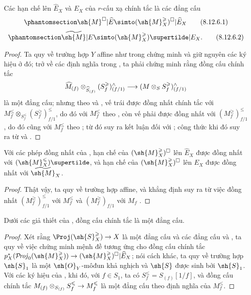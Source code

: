 \documentclass[oneside,10pt]{amsart}
\makeatletter
\renewcommand{\leq}{\leqslant}
\renewcommand{\geq}{\geqslant}
\newcommand{\ega@arrow}[2]{\mathchoice{#1}{#2}{#2}{#2}}
\renewcommand{\to}{\ega@arrow{\longrightarrow}{\rightarrow}}
\def\shProj{\mathcal{P}\!\mathit{roj}}
\newcommand{\oldpage}[2][]{\marginnote{\normalfont\footnotesize\textbf{#1}~|~#2}\ignorespaces}
\let\EGAOriginalLabel\label
\renewcommand{\label}[1]{\phantomsection\EGAOriginalLabel{#1}}
\makeatother
\begin{document}
\begin{proposition}[8.12.6]
\label{II.8.12.6}
Các hạn chế lên $\widehat{E}_X$ và $E_X$ của $r$-cấu xạ chính tắc  là các đẳng cấu
\[
\label{II.8.12.6.1}
  \sh{M}^{\square}|\widehat{E}
  \simto(\sh{M}_X^{\geq})^{\square}|\widehat{E}_X
\tag{8.12.6.1}
\]
\[
\label{II.8.12.6.2}
  \widetilde{\sh{M}}|E
  \simto(\sh{M}_X^{\geq})\supertilde|E_X.
\tag{8.12.6.2}
\]
\end{proposition}

\begin{proof}
Ta quy về trường hợp $Y$ affine như trong chứng minh  và giữ nguyên các ký hiệu ở đó;
trở về các định nghĩa trong , ta phải chứng minh rằng đồng cấu chính tắc
\[
  \widehat{M}_{(f)}\otimes_{\widehat{S}_{(f)}}
  (S_f^{\geq})_{(f/1)}^{\wedge}
  \to(M\otimes_S S_f^{\geq})_{(f/1)}^{\wedge}
\]
là một đẳng cấu;
nhưng theo  và , vế trái được đồng nhất chính tắc với
$M_f^{\leq}\otimes_{S_f^{\leq}}(S_f^{\geq})_{f/1}^{\leq}$, do đó với $M_f^{\leq}$ theo , còn vế phải được đồng nhất với $(M_f^{\geq})_{f/1}^{\leq}$, do đó cũng với $M_f^{\leq}$ theo ;
từ đó suy ra kết luận đối với ;
công thức  khi đó suy ra từ  và .
\end{proof}

\begin{corollary}[8.12.7]
\label{II.8.12.7}
Với các phép đồng nhất của , hạn chế của $(\sh{M}_X^{\geq})^{\square}$ lên $\widehat{E}_X$ được đồng nhất với $(\sh{M}_X^{\leq})\supertilde$, và hạn chế của $(\sh{M}_X^{\geq})^{\square}$ lên $E_X$ được đồng nhất với $\widetilde{\sh{M}}_X$.
\end{corollary}

\begin{proof}
Thật vậy, ta quy về trường hợp affine, và khẳng định suy ra từ việc đồng nhất $(M_f^{\geq})_{f/1}^{\leq}$ với $M_f^{\leq}$ và $(M_f^{\geq})_{f/1}$ với $M_f$ .
\end{proof}

\begin{proposition}[8.12.8]
\label{II.8.12.8}
Dưới các giả thiết của , đồng cấu chính tắc  là một đẳng cấu.
\end{proposition}

\begin{proof}
Xét rằng $\Proj(\sh{S}_X^{\geq})\to X$ là một đẳng cấu  và các
\oldpage[II]{195}
đẳng cấu  và , ta quy về việc chứng minh mệnh đề tương ứng cho đồng cấu chính tắc
$p_X^*(\shProj_0(\sh{M}_X^{\geq}))
\to(\sh{M}_X^{\geq})^{\square}|\widehat{E}_X$;
nói cách khác, ta quy về trường hợp $\sh{S}_1$ là một $\sh{O}_Y$-môđun khả nghịch và $\sh{S}$ được sinh bởi $\sh{S}_1$.
Với các ký hiệu của , khi đó, với $f\in S_1$, ta có $S_f^{\leq}=S_{(f)}[1/f]$, và đồng cấu chính tắc
$M_{(f)}\otimes_{S_{(f)}}S_f^{\leq}\to M_f^{\leq}$ là một đẳng cấu theo định nghĩa của $M_f^{\leq}$.
\end{proof}
\end{document}
